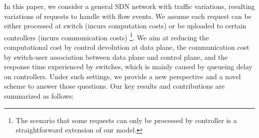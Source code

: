 \documentclass[10pt,journal,compsoc]{IEEEtran}
\begin{document}
In this paper, we consider a general SDN network with traffic variations, resulting variations of requests to handle with flow events. We assume each request can be either processed at switch (incurs computation costs) or be uploaded to certain controllers (incurs communication costs) \footnote{The scenario that some requests can only be processed by controller is a straightforward extension of our model.}. We aim at reducing the computational cost by control devolution at data plane, the communication cost by switch-user association between data plane and control plane, and the response time experienced by switches, which is mainly caused by queueing delay on controllers. Under such settings, we provide a new perspective and a novel scheme to answer those questions. Our key results and contributions are summarized as follows:
\end{document}

